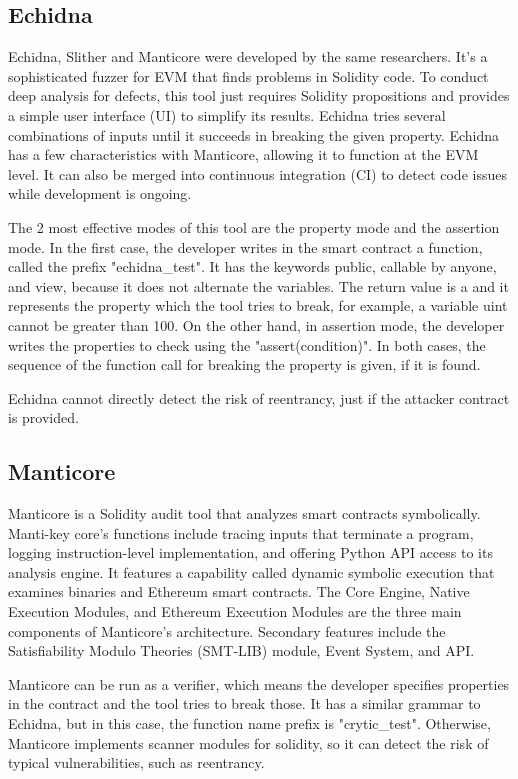 \documentclass[a4paper,sigconf, language=french,
language=german, language=spanish, language=english]{acmart}
\begin{document}
\subsection{Echidna} 
Echidna, Slither and Manticore were developed by the same researchers.
It's a sophisticated fuzzer for EVM that finds problems in Solidity code.
To conduct deep analysis for defects, this tool just requires Solidity propositions and provides a simple user interface (UI) to simplify its results.
Echidna tries several combinations of inputs until it succeeds in breaking the given property.
Echidna has a few characteristics with Manticore, allowing it to function at the EVM level.
It can also be merged into continuous integration (CI) to detect code issues while development is ongoing. 

The 2 most effective modes of this tool are the property mode and the assertion mode. In the first case, the developer writes in the smart contract a function, called the prefix "echidna\_test". It has the keywords public, callable by anyone, and view, because it does not alternate the variables. The return value is a  and it represents the property which the tool tries to break, for example, a variable uint cannot be greater than 100. On the other hand, in assertion mode, the developer writes the properties to check using the "assert(condition)". In both cases, the sequence of the function call for breaking the property is given, if it is found.

Echidna cannot directly detect the risk of reentrancy, just if the attacker contract is provided.

\subsection{Manticore} 
Manticore is a Solidity audit tool that analyzes smart contracts symbolically.
Manti-key core's functions include tracing inputs that terminate a program, logging instruction-level implementation, and offering Python API access to its analysis engine.
It features a capability called dynamic symbolic execution that examines binaries and Ethereum smart contracts.
The Core Engine, Native Execution Modules, and Ethereum Execution Modules are the three main components of Manticore's architecture.
Secondary features include the Satisfiability Modulo Theories (SMT-LIB) module, Event System, and API. 

Manticore can be run as a verifier, which means the developer specifies properties in the contract and the tool tries to break those. It has a similar grammar to Echidna, but in this case, the function name prefix is "crytic\_test". Otherwise, Manticore implements scanner modules for solidity, so it can detect the risk of typical vulnerabilities, such as reentrancy.
\end{document}
